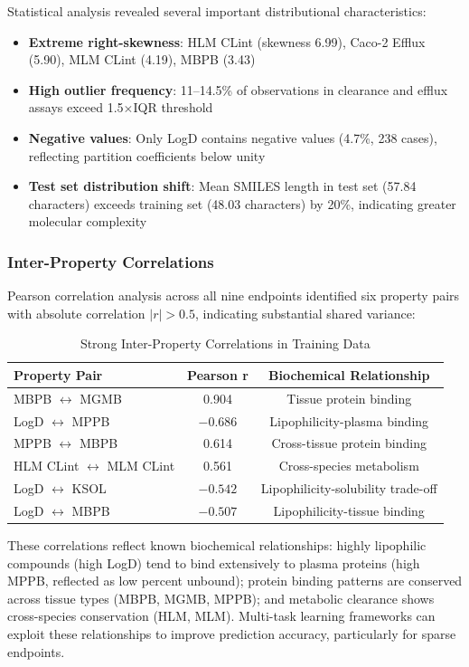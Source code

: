 \documentclass[11pt,a4paper]{article}
\begin{document}
Statistical analysis revealed several important distributional characteristics:
\begin{itemize}
    \item \textbf{Extreme right-skewness}: HLM CLint (skewness 6.99), Caco-2 Efflux (5.90), MLM CLint (4.19), MBPB (3.43)
    \item \textbf{High outlier frequency}: 11--14.5\% of observations in clearance and efflux assays exceed 1.5$\times$IQR threshold
    \item \textbf{Negative values}: Only LogD contains negative values (4.7\%, 238 cases), reflecting partition coefficients below unity
    \item \textbf{Test set distribution shift}: Mean SMILES length in test set (57.84 characters) exceeds training set (48.03 characters) by 20\%, indicating greater molecular complexity
\end{itemize}

\subsubsection{Inter-Property Correlations}

Pearson correlation analysis across all nine endpoints identified six property pairs with absolute correlation $|r| > 0.5$, indicating substantial shared variance:

\begin{table}[h]
\centering
\caption{Strong Inter-Property Correlations in Training Data}
\label{tab:correlations}
\begin{tabular}{lcc}
\toprule
Property Pair & Pearson r & Biochemical Relationship \\
\midrule
MBPB $\leftrightarrow$ MGMB & 0.904 & Tissue protein binding \\
LogD $\leftrightarrow$ MPPB & $-0.686$ & Lipophilicity-plasma binding \\
MPPB $\leftrightarrow$ MBPB & 0.614 & Cross-tissue protein binding \\
HLM CLint $\leftrightarrow$ MLM CLint & 0.561 & Cross-species metabolism \\
LogD $\leftrightarrow$ KSOL & $-0.542$ & Lipophilicity-solubility trade-off \\
LogD $\leftrightarrow$ MBPB & $-0.507$ & Lipophilicity-tissue binding \\
\bottomrule
\end{tabular}
\end{table}

These correlations reflect known biochemical relationships: highly lipophilic compounds (high LogD) tend to bind extensively to plasma proteins (high MPPB, reflected as low percent unbound); protein binding patterns are conserved across tissue types (MBPB, MGMB, MPPB); and metabolic clearance shows cross-species conservation (HLM, MLM). Multi-task learning frameworks can exploit these relationships to improve prediction accuracy, particularly for sparse endpoints.
\end{document}
